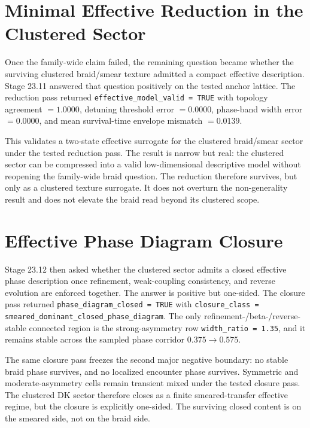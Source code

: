 \documentclass[11pt]{article}
\begin{document}
\section{Minimal Effective Reduction in the Clustered Sector}

Once the family-wide claim failed, the remaining question became whether the surviving clustered braid/smear texture admitted a compact effective description. Stage 23.11 answered that question positively on the tested anchor lattice. The reduction pass returned \texttt{effective\_model\_valid = TRUE} with topology agreement $= 1.0000$, detuning threshold error $= 0.0000$, phase-band width error $= 0.0000$, and mean survival-time envelope mismatch $= 0.0139$.

This validates a two-state effective surrogate for the clustered braid/smear sector under the tested reduction pass. The result is narrow but real: the clustered sector can be compressed into a valid low-dimensional descriptive model without reopening the family-wide braid question. The reduction therefore survives, but only as a clustered texture surrogate. It does not overturn the non-generality result and does not elevate the braid read beyond its clustered scope.

\section{Effective Phase Diagram Closure}

Stage 23.12 then asked whether the clustered sector admits a closed effective phase description once refinement, weak-coupling consistency, and reverse evolution are enforced together. The answer is positive but one-sided. The closure pass returned \texttt{phase\_diagram\_closed = TRUE} with \texttt{closure\_class = smeared\_dominant\_closed\_phase\_diagram}. The only refinement-/beta-/reverse-stable connected region is the strong-asymmetry row \texttt{width\_ratio = 1.35}, and it remains stable across the sampled phase corridor $0.375 \rightarrow 0.575$.

The same closure pass freezes the second major negative boundary: no stable braid phase survives, and no localized encounter phase survives. Symmetric and moderate-asymmetry cells remain transient mixed under the tested closure pass. The clustered DK sector therefore closes as a finite smeared-transfer effective regime, but the closure is explicitly one-sided. The surviving closed content is on the smeared side, not on the braid side.
\end{document}
